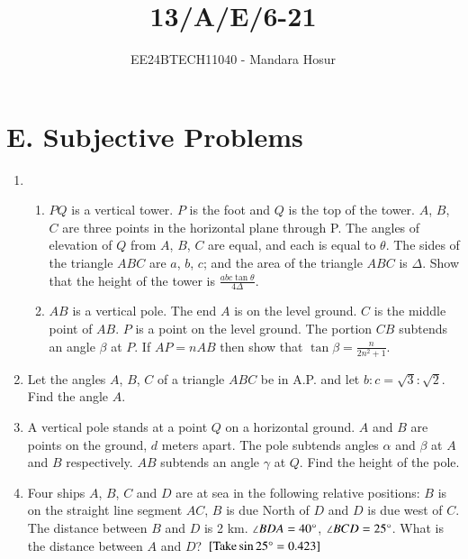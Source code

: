 \documentclass[journal,12pt,twocolumn]{IEEEtran}
\theoremstyle{remark}
\begin{document}

\vspace{3cm}

\title{13/A/E/6-21}
\author{EE24BTECH11040 - Mandara Hosur}
\maketitle
\newpage
\bigskip

\renewcommand{\thefigure}{\theenumi}
\renewcommand{\thetable}{\theenumi}

\section*{\textbf{E. Subjective Problems}}

\begin{enumerate}

\item 
\begin{enumerate}
\item $PQ$ is a vertical tower. $P$ is the foot and $Q$ is the top of the tower. $A$, $B$, $C$ are three points in the horizontal plane through P. The angles of elevation of $Q$ from $A$, $B$, $C$ are equal, and each is equal to $\theta$. The sides of the triangle $ABC$ are $a$, $b$, $c$; and the area of the triangle $ABC$ is $\Delta$. Show that the height of the tower is $\frac{abc\tan{\theta}}{4\Delta}$.
\item $AB$ is a vertical pole. The end $A$ is on the level ground. $C$ is the middle point of $AB$. $P$ is a point on the level ground. The portion $CB$ subtends an angle $\beta$ at $P$. If $AP=nAB$ then show that $\tan{\beta}=\frac{n}{2n^2+1}$.
\end{enumerate}

\hfill{}

\item Let the angles $A$, $B$, $C$ of a triangle $ABC$ be in A.P. and let $b:c=\sqrt{3}:\sqrt{2}$. Find the angle $A$. 

\hfill{}

\item A vertical pole stands at a point $Q$ on a horizontal ground. $A$ and $B$ are points on the ground, $d$ meters apart. The pole subtends angles $\alpha$ and $\beta$ at $A$ and $B$ respectively. $AB$ subtends an angle $\gamma$ at $Q$. Find the height of the pole. 

\hfill{}

\item Four ships $A$, $B$, $C$ and $D$ are at sea in the following relative positions: $B$ is on the straight line segment $AC$, $B$ is due North of $D$ and $D$ is due west of $C$. The distance between $B$ and $D$ is 2 km. $\angle{BDA}=40\degree$, $\angle{BCD}=25\degree$. What is the distance between $A$ and $D$? ${}\left[\text{Take} \sin{25\degree}=0.423\right]$


\end{enumerate}
\end{document}
